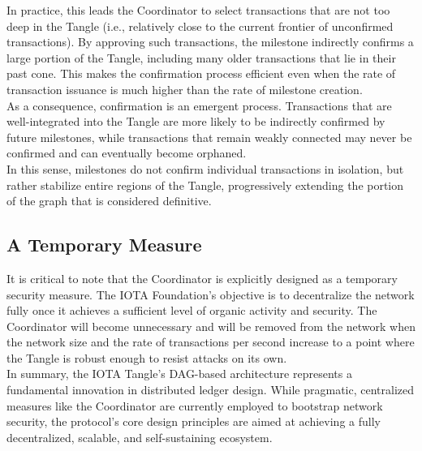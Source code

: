\documentclass{scrbook}
\begin{document}
In practice, this leads the Coordinator to select transactions that are not too deep in the Tangle (i.e., relatively close to the current frontier of unconfirmed transactions). By approving such transactions, the milestone indirectly confirms a large portion of the Tangle, including many older transactions that lie in their past cone. This makes the confirmation process efficient even when the rate of transaction issuance is much higher than the rate of milestone creation.\\

As a consequence, confirmation is an emergent process. Transactions that are well-integrated into the Tangle are more likely to be indirectly confirmed by future milestones, while transactions that remain weakly connected may never be confirmed and can eventually become orphaned.\\

In this sense, milestones do not confirm individual transactions in isolation, but rather stabilize entire regions of the Tangle, progressively extending the portion of the graph that is considered definitive.

\subsection{A Temporary Measure}

It is critical to note that the Coordinator is explicitly designed as a temporary security measure. The IOTA Foundation's objective is to decentralize the network fully once it achieves a sufficient level of organic activity and security. The Coordinator will become unnecessary and will be removed from the network when the network size and the rate of transactions per second increase to a point where the Tangle is robust enough to resist attacks on its own.\\

In summary, the IOTA Tangle's DAG-based architecture represents a fundamental innovation in distributed ledger design. While pragmatic, centralized measures like the Coordinator are currently employed to bootstrap network security, the protocol's core design principles are aimed at achieving a fully decentralized, scalable, and self-sustaining ecosystem.
\end{document}

